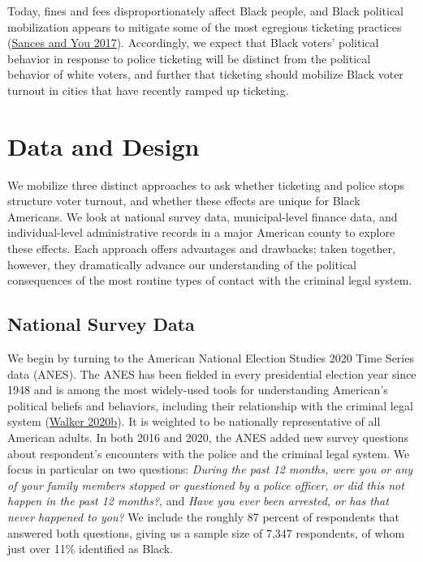 \documentclass[
  12pt,
]{article}
\begin{document}
Today, fines and fees disproportionately affect Black people, and Black political mobilization appears to mitigate some of the most egregious ticketing practices (\protect\hyperlink{ref-Sances2017}{Sances and You 2017}). Accordingly, we expect that Black voters' political behavior in response to police ticketing will be distinct from the political behavior of white voters, and further that ticketing should mobilize Black voter turnout in cities that have recently ramped up ticketing.

\hypertarget{data-and-design}{%
\section*{Data and Design}\label{data-and-design}}

We mobilize three distinct approaches to ask whether ticketing and police stops structure voter turnout, and whether these effects are unique for Black Americans. We look at national survey data, municipal-level finance data, and individual-level administrative records in a major American county to explore these effects. Each approach offers advantages and drawbacks; taken together, however, they dramatically advance our understanding of the political consequences of the most routine types of contact with the criminal legal system.

\hypertarget{national-survey-data}{%
\subsection*{National Survey Data}\label{national-survey-data}}

We begin by turning to the American National Election Studies 2020 Time Series data (ANES). The ANES has been fielded in every presidential election year since 1948 and is among the most widely-used tools for understanding American's political beliefs and behaviors, including their relationship with the criminal legal system (\protect\hyperlink{ref-Walker2020}{Walker 2020b}). It is weighted to be nationally representative of all American adults. In both 2016 and 2020, the ANES added new survey questions about respondent's encounters with the police and the criminal legal system. We focus in particular on two questions: \emph{During the past 12 months, were you or any of your family members stopped or questioned by a police officer, or did this not happen in the past 12 months?}, and \emph{Have you ever been arrested, or has that never happened to you?} We include the roughly 87 percent of respondents that answered both questions, giving us a sample size of 7,347 respondents, of whom just over 11\% identified as Black.
\end{document}
